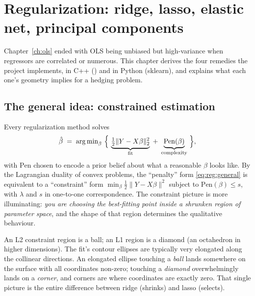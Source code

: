 \section{Regularization: ridge, lasso, elastic net, principal components}
\label{ch:regularization}

Chapter~\ref{ch:ols} ended with OLS being unbiased but high-variance when regressors are
correlated or numerous. This chapter derives the four remedies the project implements,
in C++ () and in Python (sklearn), and explains what
each one's geometry implies for a hedging problem.

\subsection{The general idea: constrained estimation}
\label{sec:reg:idea}

Every regularization method solves
\begin{equation}
  \hat\beta \;=\; \argmin_{\beta}\ \Bigl\{\ \underbrace{\tfrac12\lVert Y-X\beta\rVert_2^2}_{\text{fit}}
  \;+\; \underbrace{\mathrm{Pen}(\beta)}_{\text{complexity}}\ \Bigr\},
  \label{eq:reg:general}
\end{equation}
with $\mathrm{Pen}$ chosen to encode a prior belief about what a reasonable $\beta$ looks
like. By the Lagrangian duality of convex problems, the ``penalty'' form
\eqref{eq:reg:general} is equivalent to a ``constraint'' form
$\min_\beta \tfrac12\lVert Y-X\beta\rVert^2$ subject to $\mathrm{Pen}(\beta)\le s$, with
$\lambda$ and $s$ in one-to-one correspondence. The constraint picture is more
illuminating: \emph{you are choosing the best-fitting point inside a shrunken region of
parameter space}, and the shape of that region determines the qualitative behaviour.

\begin{intuition}
An L2 constraint region is a ball; an L1 region is a diamond (an octahedron in higher
dimensions). The fit's contour ellipses are typically very elongated along the
collinear directions. An elongated ellipse touching a \emph{ball} lands somewhere on the
surface with all coordinates non-zero; touching a \emph{diamond} overwhelmingly lands on
a \emph{corner}, and corners are where coordinates are exactly zero. That single picture
is the entire difference between ridge (shrinks) and lasso (selects).
\end{intuition}

